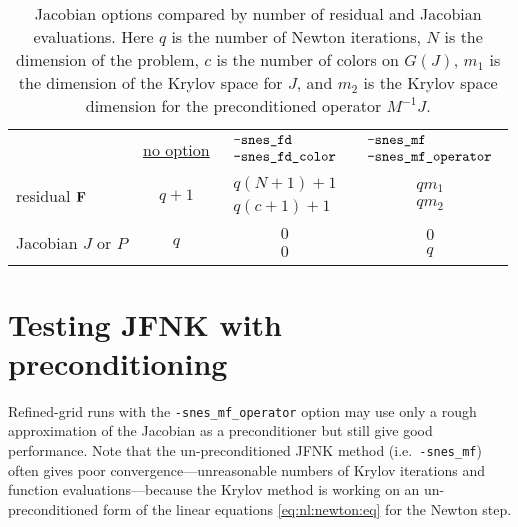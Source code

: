 \begin{table}
\begin{tabular}{lccc}
 &\underline{no option}
                       & \small\underline{$\begin{array}{ll} \text{\texttt{-snes\_fd}} \\ \text{\texttt{-snes\_fd\_color}} \end{array}$}
                                    & \small\underline{$\begin{array}{ll} \text{\texttt{-snes\_mf}} \\ \text{\texttt{-snes\_mf\_operator}} \end{array}$} \vspace{0.2in} \\
residual $\mathbf{F}$        & $q+1$ & $\begin{array}{cc} q(N+1)+1 \\ q(c+1)+1 \end{array}$ & $\begin{array}{cc} q m_1 \\ q m_2 \end{array}$ \vspace{0.1in} \\
Jacobian $J$ or $P$    & $q$ & $\begin{array}{cc} 0 \\ 0 \end{array}$ & $\begin{array}{cc} 0 \\ q \end{array}$
\end{tabular}
\caption{Jacobian options compared by number of residual and Jacobian evaluations.  Here $q$ is the number of Newton iterations, $N$ is the dimension of the problem, $c$ is the number of colors on $G(J)$, $m_1$ is the dimension of the Krylov space for $J$, and $m_2$ is the Krylov space dimension for the preconditioned operator $M^{-1}J$.} \label{tab:snesjacobianoptions:evals}
\end{table}


\section{Testing JFNK with preconditioning} \label{sec:testsnesmfoperator}

Refined-grid runs with the \texttt{-snes\_mf\_operator} option may use only a rough approximation of the Jacobian as a preconditioner but still give good performance.  Note that the un-preconditioned JFNK method (i.e.~\texttt{-snes\_mf}) often gives poor convergence---unreasonable numbers of Krylov iterations and function evaluations---because the Krylov method is working on an un-preconditioned form of the linear equations \eqref{eq:nl:newton:eq} for the Newton step.

